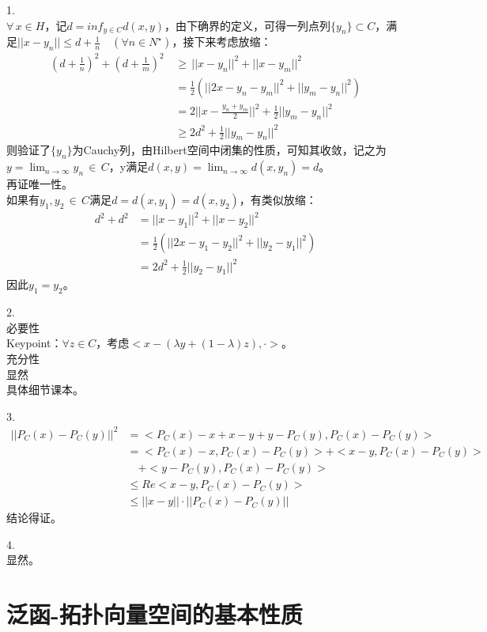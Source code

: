 \documentclass[
]{article}
\begin{document}
1.\\
\(\forall \, x\in H\)，记\(d=inf_{y \in C}d(x,y)\)，由下确界的定义，可得一列点列\(\{y_{n}\}\subset C\)，满足\(||x-y_{n}||\leq d+\frac{1}{n}\quad(\forall n\in N^{\star})\)，接下来考虑放缩：
\[
\begin{aligned}
(d+\frac{1}{n})^{2}+(d+\frac{1}{m})^{2} \, & \geq \, ||x-y_{n}||^{2}+||x-y_{m}||^{2} \\
&=\frac{1}{2}(||2x-y_{n}-y_{m}||^{2}+||y_{m}-y_{n}||^{2})\\
&=2||x-\frac{y_{n}+y_{m}}{2}||^{2}+\frac{1}{2}||y_{m}-y_{n}||^{2}\\
&\geq 2d^{2}+\frac{1}{2}||y_{m}-y_{n}||^{2}
\end{aligned}
\]
则验证了\(\{y_{n}\}\)为Cauchy列，由Hilbert空间中闭集的性质，可知其收敛，记之为\(y=\lim_{n\rightarrow\infty}y_{n}\,\in\,C\)，y满足\(d(x,y)=\lim_{n\rightarrow\infty}d(x,y_{n})=d\)。\\
再证唯一性。\\
如果有\(y_{1},y_{2}\, \in \, C\)满足\(d=d(x,y_{1})=d(x,y_{2})\)，有类似放缩：
\[
\begin{aligned}
d^{2}+d^{2}&=||x-y_{1}||^{2}+||x-y_{2}||^{2}\\
&=\frac{1}{2}(||2x-y_{1}-y_{2}||^{2}+||y_{2}-y_{1}||^{2})\\
&=2d^{2}+\frac{1}{2}||y_{2}-y_{1}||^{2}
\end{aligned}
\]
因此\(y_{1}=y_{2}\)。

2.\\
必要性\\
Keypoint：\(\forall z\in C\)，考虑\(<x-(\lambda y+(1-\lambda)z),·>\)。\\
充分性\\
显然\\
具体细节课本。

3.
\[
\begin{aligned}
||P_{C}(x)-P_{C}(y)||^{2}&=<P_{C}(x)-x+x-y+y-P_{C}(y),P_{C}(x)-P_{C}(y)>\\
&=<P_{C}(x)-x,P_{C}(x)-P_{C}(y)>+<x-y,P_{C}(x)-P_{C}(y)>\\
&{\quad}+<y-P_{C}(y),P_{C}(x)-P_{C}(y)>\\
&\leq Re<x-y,P_{C}(x)-P_{C}(y)>\\
&\leq ||x-y||\cdot||P_{C}(x)-P_{C}(y)||
\end{aligned}
\]
结论得证。

4.\\
显然。

\hypertarget{ux6cdbux51fd-ux62d3ux6251ux5411ux91cfux7a7aux95f4ux7684ux57faux672cux6027ux8d28}{%
\section{泛函-拓扑向量空间的基本性质}\label{ux6cdbux51fd-ux62d3ux6251ux5411ux91cfux7a7aux95f4ux7684ux57faux672cux6027ux8d28}}
\end{document}
